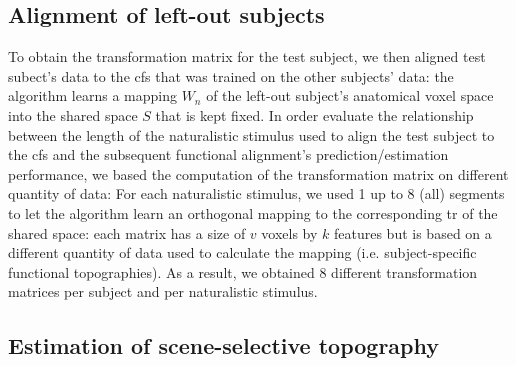 \subsection{Alignment of left-out subjects}






%
To obtain the transformation matrix for the test subject, we then aligned
test subect's data to the \ac{cfs} that was trained on the
other subjects' data:
%
the algorithm learns a mapping $W_{n}$ of the left-out subject's anatomical
voxel space into the shared space $S$ that is kept fixed.
%
In order evaluate the relationship between the length of the naturalistic
stimulus used to align the test subject to the \ac{cfs} and the
subsequent functional alignment's prediction/estimation performance, we based
the computation of the transformation matrix on different quantity of data:
%
For each naturalistic stimulus, we used 1 up to 8 (all) segments to let the
algorithm learn an orthogonal mapping to the corresponding \acs{tr} of the
shared space:
%
each matrix has a size of $v$ voxels by $k$ features but is based on a different
quantity of data used to calculate the mapping (i.e. subject-specific functional
topographies).
%
As a result, we obtained 8 different transformation matrices per subject and per
naturalistic stimulus.


\subsection{Estimation of scene-selective topography}




